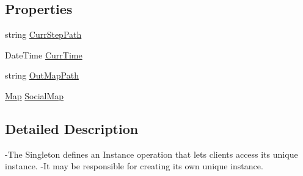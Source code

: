 \subsection*{Properties}
\begin{DoxyCompactItemize}
\item 
string \hyperlink{class_s_e_a_r_c_h_1_1_map_manager_ada192f43b2ce14fa7c4d402473a6c444}{Curr\-Step\-Path}
\item 
Date\-Time \hyperlink{class_s_e_a_r_c_h_1_1_map_manager_ad7af026f576de4585748def8f4221fa2}{Curr\-Time}
\item 
string \hyperlink{class_s_e_a_r_c_h_1_1_map_manager_a732a1202f0f703b855eecf3b1a607afa}{Out\-Map\-Path}
\item 
\hyperlink{class_s_e_a_r_c_h_1_1_map}{Map} \hyperlink{class_s_e_a_r_c_h_1_1_map_manager_a7d1956765c5b914c90b9b957c1b49717}{Social\-Map}
\end{DoxyCompactItemize}


\subsection{Detailed Description}
-\/\-The Singleton defines an Instance operation that lets clients access its unique instance. -\/\-It may be responsible for creating its own unique instance. 



